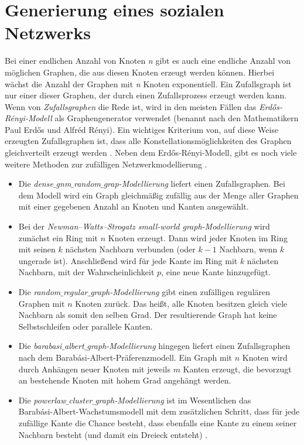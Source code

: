 \section{Generierung eines sozialen Netzwerks} 
Bei einer endlichen Anzahl von Knoten \textit{n} gibt es auch eine endliche Anzahl von möglichen Graphen, die aus diesen Knoten erzeugt werden können. Hierbei wächst die Anzahl der Graphen mit \textit{n} Knoten exponentiell.
Ein Zufallsgraph ist nur einer dieser Graphen, der durch einen Zufallsprozess erzeugt werden kann.
Wenn von \textit{Zufallsgraphen} die Rede ist, wird in den meisten Fällen das \textit{Erdős-Rényi-Modell} als Graphengenerator verwendet (benannt nach den Mathematikern Paul Erdős und Alfréd Rényi). Ein wichtiges Kriterium von, auf diese Weise erzeugten Zufallsgraphen ist, dass alle Konstellationsmöglichkeiten des Graphen gleichverteilt erzeugt werden \cite{Generators}.
Neben dem Erdős-Rényi-Modell, gibt es noch viele weitere Methoden zur zufälligen Netzwerkmodellierung \cite{Generators}.
\begin{itemize}
    \item Die \textit{dense$\_$gnm$\_$random$\_$grap-Modellierung} liefert einen Zufallsgraphen.
    Bei dem Modell wird ein Graph gleichmäßig zufällig aus der Menge aller Graphen mit einer gegebenen Anzahl an Knoten und Kanten ausgewählt.
    \item Bei der \textit{Newman–Watts–Strogatz small-world graph-Modellierung} wird zunächst ein Ring mit $n$ Knoten erzeugt. Dann wird jeder Knoten im Ring mit seinen $k$ nächsten Nachbarn verbunden (oder $k - 1$ Nachbarn, wenn $k$ ungerade ist). Anschließend wird für jede Kante im Ring mit $k$ nächsten Nachbarn, mit der Wahrscheinlichkeit $p$, eine neue Kante hinzugefügt.
    \item Die \textit{random$\_$regular$\_$graph-Modellierung} gibt einen zufälligen regulären Graphen mit $n$ Knoten zurück. Das heißt, alle Knoten besitzen gleich viele Nachbarn als somit den selben Grad.
    Der resultierende Graph hat keine Selbstschleifen oder parallele Kanten.
    \item Die \textit{barabasi$\_$albert$\_$graph-Modellierung} hingegen liefert einen Zufallsgraphen nach dem Barabási-Albert-Präferenzmodell.
    Ein Graph mit $n$ Knoten wird durch Anhängen neuer Knoten mit jeweils $m$ Kanten erzeugt, die bevorzugt an bestehende Knoten mit hohem Grad angehängt werden.
    \item Die \textit{powerlaw$\_$cluster$\_$graph-Modellierung} ist im Wesentlichen das\\ Barabási-Albert-Wachstumsmodell mit dem zusätzlichen Schritt, dass für jede zufällige Kante die Chance besteht, dass ebenfalls eine Kante zu einem seiner Nachbarn besteht (und damit ein Dreieck entsteht) \cite{Generators}.
\end{itemize}

